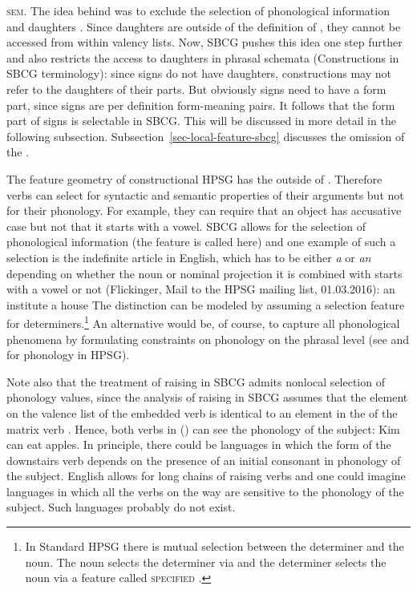 \documentclass[output=paper
	        ,collection
	        ,collectionchapter
 	        ,biblatex
                ,babelshorthands
                ,newtxmath
                ,draftmode
                ,colorlinks, citecolor=brown
]{langscibook}
\begin{document}
\textsc{sem}. The idea behind \synsem was to exclude the selection of phonological information and
daughters \citep[]{ps2}. Since daughters are outside of the definition of , they cannot be accessed from
within valency lists. Now, SBCG pushes this idea one step further and also restricts the access
to daughters in phrasal schemata (Constructions in SBCG terminology): since signs do not have
daughters, constructions may not refer to the daughters of their parts. But obviously signs need to
have a form part, since signs are per definition form-meaning pairs. It follows that the form part of
signs is selectable in SBCG. This will be discussed in more detail in the following
subsection. Subsection~\ref{sec-local-feature-sbcg} discusses the omission of the \localf.



The feature geometry of constructional HPSG has the \phonv outside of \synsem. Therefore verbs can
select for syntactic and semantic properties of their arguments but not for their phonology. For
example, they can require that an object has accusative case but not that it starts with a
vowel. SBCG allows for the selection of phonological information (the feature is called \form here)
and one example of such a selection is the indefinite article in English, which has to be either \emph{a} or
\emph{an} depending on whether the noun or nominal projection it is combined with starts with a
vowel or not (Flickinger, Mail to the HPSG mailing list, 01.03.2016):
\eal
\ex an institute
\ex a  house
\zl
The distinction can be modeled by assuming a selection feature for determiners.\footnote{%
  In Standard HPSG there is mutual selection between the determiner and the noun. The noun selects
  the determiner via \spr and the determiner selects the noun via a feature called
  \textsc{specified} \citep[--54]{ps2}. 
} An alternative would be, of course, to capture all phonological phenomena by formulating constraints on phonology on the
phrasal level (see \citealp{BK94b} and \citealp{Walther99a-u} for phonology in HPSG).

Note also that the treatment of raising in SBCG admits nonlocal selection of phonology
values, since the analysis of raising in SBCG assumes that the element on the valence list of the
embedded verb is identical to an element in the \argstl of the matrix verb \citep[]{Sag2012a}. Hence, both verbs in () can see the phonology of the subject:
\ea
Kim can eat apples.
\z
In principle, there could be languages in which the form of the downstairs verb depends on the
presence of an initial consonant in phonology of the subject. English allows for long chains of
raising verbs and one could imagine languages in which all the verbs on the way are sensitive to the
phonology of the subject. Such languages probably do not exist.
\end{document}
